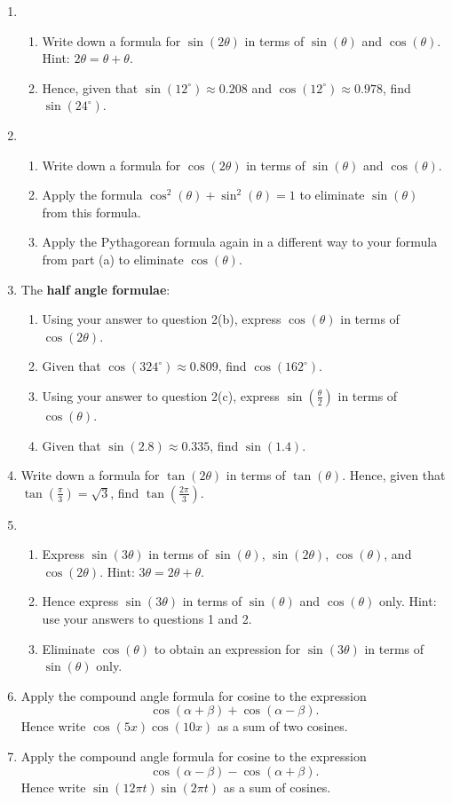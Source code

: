 \documentclass{article}
\begin{document}
\begin{enumerate}
\item
	\begin{enumerate}
	\item Write down a formula for $\sin(2\theta)$ in terms of $\sin(\theta)$ and $\cos(\theta)$. Hint: $2\theta = \theta + \theta$.
	\item Hence, given that $\sin(12^\circ)\approx 0.208$ and $\cos(12^\circ)\approx 0.978$, find $\sin(24^\circ)$.
	\end{enumerate}
\item \begin{enumerate}
	\item Write down a formula for $\cos(2\theta)$ in terms of $\sin(\theta)$ and $\cos(\theta)$.
	\item Apply the formula $\cos^2(\theta)+\sin^2(\theta)=1$ to eliminate $\sin(\theta)$ from this formula.
	\item Apply the Pythagorean formula again in a different way to your formula from part (a) to eliminate $\cos(\theta)$.
	\end{enumerate}
\item The \textbf{half angle formulae}:
	\begin{enumerate}
	\item Using your answer to question 2(b), express $\cos\left(\theta\right)$ in terms of $\cos(2\theta)$.
	\item Given that $\cos(324^\circ)\approx 0.809$, find $\cos(162^\circ)$.
	\item Using your answer to question 2(c), express $\sin\left(\frac{\theta}{2}\right)$ in terms of $\cos(\theta)$.
	\item Given that $\sin(2.8)\approx 0.335$, find $\sin(1.4)$.
	\end{enumerate}
\item Write down a formula for $\tan(2\theta)$ in terms of $\tan(\theta)$.
Hence, given that $\tan\left(\frac{\pi}{3}\right)=\sqrt{3}$, find $\tan\left(\frac{2\pi}{3}\right)$.
\item \begin{enumerate}
	\item Express $\sin(3\theta)$ in terms of $\sin(\theta)$, $\sin(2\theta)$, $\cos(\theta)$, and $\cos(2\theta)$. Hint: $3\theta=2\theta+\theta$.
	\item Hence express $\sin(3\theta)$ in terms of $\sin(\theta)$ and $\cos(\theta)$ only. Hint: use your answers to questions 1 and 2.
	\item Eliminate $\cos(\theta)$ to obtain an expression for $\sin(3\theta)$ in terms of $\sin(\theta)$ only.
	\end{enumerate}
\item Apply the compound angle formula for cosine to the expression
\[\cos(\alpha+\beta) + \cos(\alpha-\beta).\]
Hence write $\cos(5x)\cos(10x)$ as a sum of two cosines.
\item Apply the compound angle formula for cosine to the expression
\[\cos(\alpha-\beta) - \cos(\alpha+\beta).\]
Hence write $\sin(12\pi t)\sin(2\pi t)$ as a sum of cosines.
\end{enumerate}
\end{document}
